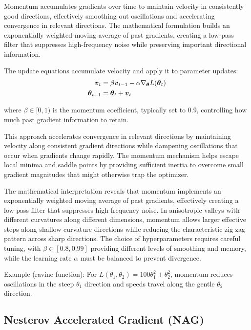 Momentum accumulates gradients over time to maintain velocity in consistently good directions, effectively smoothing out oscillations and accelerating convergence in relevant directions. The mathematical formulation builds an exponentially weighted moving average of past gradients, creating a low-pass filter that suppresses high-frequency noise while preserving important directional information.

The update equations accumulate velocity and apply it to parameter updates:
\begin{align}
\boldsymbol{v}_t &= \beta \boldsymbol{v}_{t-1} - \alpha \nabla_{\boldsymbol{\theta}} L(\boldsymbol{\theta}_t) \\
\boldsymbol{\theta}_{t+1} &= \boldsymbol{\theta}_t + \boldsymbol{v}_t
\end{align}

where $\beta \in [0, 1)$ is the momentum coefficient, typically set to 0.9, controlling how much past gradient information to retain.

This approach accelerates convergence in relevant directions by maintaining velocity along consistent gradient directions while dampening oscillations that occur when gradients change rapidly. The momentum mechanism helps escape local minima and saddle points by providing sufficient inertia to overcome small gradient magnitudes that might otherwise trap the optimizer.

The mathematical interpretation reveals that momentum implements an exponentially weighted moving average of past gradients, effectively creating a low-pass filter that suppresses high-frequency noise. In anisotropic valleys with different curvatures along different dimensions, momentum allows larger effective steps along shallow curvature directions while reducing the characteristic zig-zag pattern across sharp directions. The choice of hyperparameters requires careful tuning, with \(\beta\in[0.8,0.99]\) providing different levels of smoothing and memory, while the learning rate \(\alpha\) must be balanced to prevent divergence.\cite{Polyak1964,WebOptimizationDLBook,D2LChapterOptimization}

Example (ravine function): For \(L(\theta_1,\theta_2)=100\theta_1^2+\theta_2^2\), momentum reduces oscillations in the steep \(\theta_1\) direction and speeds travel along the gentle \(\theta_2\) direction.

\subsection{Nesterov Accelerated Gradient (NAG)}

